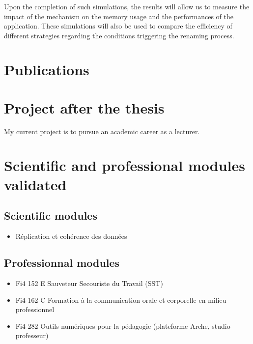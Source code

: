 \documentclass[11pt]{article}
\begin{document}
Upon the completion of such simulations, the results will allow us to measure the impact of the mechanism on the memory usage and the performances of the application.
These simulations will also be used to compare the efficiency of different strategies
regarding the conditions triggering the renaming process.

\section*{Publications}


\nocite{*}

\section*{Project after the thesis}
\hspace{1em} My current project is to pursue an academic career as a lecturer.

\section*{Scientific and professional modules validated}

\subsection*{Scientific modules}

\begin{itemize}
    \item Réplication et cohérence des données
\end{itemize}

\subsection*{Professionnal modules}

\begin{itemize}
    \item Fi4 152 E Sauveteur Secouriste du Travail (SST)
    \item Fi4 162 C Formation à la communication orale et corporelle en milieu professionnel
    \item Fi4 282 Outils numériques pour la pédagogie (plateforme Arche, studio professeur)
\end{itemize}
\end{document}
